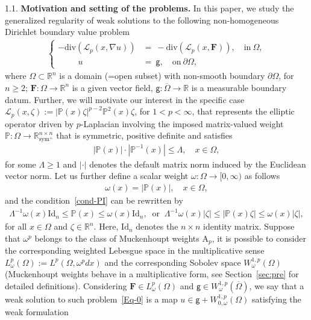 \documentclass[a4paper, 11pt]{article}
\begin{document}
1.1. \textbf{Motivation and setting of the problems.}  
In this paper, we study the generalized regularity of weak solutions to the following non-homogeneous Dirichlet boundary value problem
\begin{align}\label{Eq-0}
\begin{cases}
-\mathrm{div}\left(\mathcal{L}_p(x,\nabla u)\right) &= \ -\mathrm{div}\left(\mathcal{L}_p(x,\mathbf{F})\right),  \quad \mbox{in} \ \Omega,\\
{\hspace{1cm}} u &= \ \mathsf{g}, \quad \mbox{on} \ \partial\Omega,
\end{cases}
\end{align}
where $\Omega \subset \mathbb{R}^n$ is a domain (=open subset) with non-smooth boundary $\partial\Omega$, for $n \ge 2$; $\mathbf{F}: \Omega \to \mathbb{R}^n$ is a given vector field, $\mathsf{g}: \overline{\Omega} \to \mathbb{R}$ is a measurable boundary datum. Further, we will motivate our interest in the specific case $\mathcal{L}_p(x,\zeta):= |\mathbb{P}(x)\zeta|^{p-2}\mathbb{P}^2(x)\zeta$, for $1<p<\infty$, that represents the elliptic operator driven by $p$-Laplacian involving the imposed matrix-valued weight $\mathbb{P}: \Omega \to \mathbb{R}^{n \times n}_{\mathrm{sym}^+}$ that is symmetric, positive definite and satisfies 
\begin{align}
\label{cond-PI}
|\mathbb{P}(x)|\cdot|\mathbb{P}^{-1}(x)| \le \Lambda, \quad x \in \Omega,
\end{align}
for some $\Lambda\ge 1$ and $|\cdot|$ denotes the default matrix norm induced by the Euclidean vector norm. Let us further define a scalar weight $\omega: \Omega \to [0,\infty)$ as follows
\begin{align}\label{def-omega}
\omega(x) = |\mathbb{P}(x)|, \quad x \in \Omega,
\end{align}
and the condition~\eqref{cond-PI} can be rewritten by
\begin{align}\label{Pi-2}
\Lambda^{-1} \omega(x) \mathrm{Id}_n \le \mathbb{P}(x) \le \omega(x) \mathrm{Id}_n,  \ \mbox{ or } \
\Lambda^{-1} \omega(x) |\zeta| \le |\mathbb{P}(x)\zeta| \le \omega(x) |\zeta|, 
\end{align}
for all $x \in \Omega$ and $\zeta \in \mathbb{R}^n$. Here, $\mathrm{Id}_n$ denotes the $n \times n$ identity matrix. Suppose that $\omega^p$ belongs to the class of Muckenhoupt weights $\mathrm{A}_p$, it is possible to consider the corresponding weighted Lebesgue space in the multiplicative sense $L^p_\omega(\Omega):=L^p(\Omega,\omega^pdx)$ and the corresponding Sobolev space $W^{1,p}_{\omega}(\Omega)$ (Muckenhoupt weights behave in a multiplicative form, see Section~\ref{sec:pre} for detailed definitions). Considering $\mathbf{F} \in L^{p}_{\omega}(\Omega)$ and $\mathsf{g} \in W^{1,p}_{\omega}(\overline{\Omega})$, we say that a weak solution to such problem~\eqref{Eq-0} is a map $u \in \mathsf{g} + W^{1,p}_{0,\omega}(\Omega)$ satisfying the weak formulation
\end{document}
